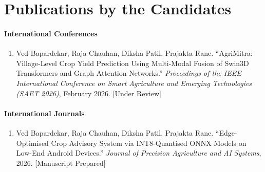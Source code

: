 \chapter*{\centering Publications by the Candidates}

\subsubsection*{International Conferences}
\begin{enumerate}
    \item Ved Bapardekar, Raja Chauhan, Diksha Patil, Prajakta Rane.
    ``AgriMitra: Village-Level Crop Yield Prediction Using Multi-Modal Fusion of Swin3D Transformers and Graph Attention Networks.''
    \textit{Proceedings of the IEEE International Conference on Smart Agriculture and Emerging Technologies (SAET 2026)},
    February 2026.
    {\color[gray]{0.3}[Under Review]}
\end{enumerate}

\subsubsection*{International Journals}
\begin{enumerate}
    \item Ved Bapardekar, Raja Chauhan, Diksha Patil, Prajakta Rane.
    ``Edge-Optimised Crop Advisory System via INT8-Quantised ONNX Models on Low-End Android Devices.''
    \textit{Journal of Precision Agriculture and AI Systems}, 2026.
    {\color[gray]{0.3}[Manuscript Prepared]}
\end{enumerate}
